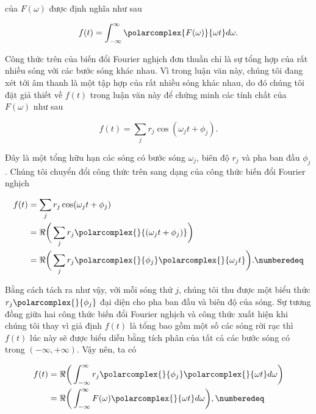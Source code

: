 		 của $F(\omega)$ được định nghĩa như sau
		
			\begin{equation}
				f(t) = \int_{-\infty}^{\infty} \polarcomplex{F(\omega)}{\omega t}d\omega.
			\end{equation}
			
		Công thức trên của biến đổi Fourier nghịch đơn thuần chỉ là sự tổng hợp của rất nhiều sóng với các bước sóng khác nhau. Vì trong luận văn này, chúng tôi đang xét tới âm thanh là một tập hợp của rất nhiều sóng khác nhau, do đó chúng tôi đặt giả thiết về $f(t)$ trong luận văn này để chứng minh các tính chất của $F(\omega)$ như sau
		
			\begin{equation}
				f(t) = \sum_{j} r_j\cos(\omega_j t + \phi_j).
			\end{equation}
			
		Đây là một tổng hữu hạn các sóng có bước sóng $\omega_j$, biên độ $r_j$ và pha ban đầu $\phi_j$. Chúng tôi chuyển đổi công thức trên sang dạng của công thức biến đổi Fourier nghịch
		
			\begin{align*}
				f(t) 	& =  \sum_{j} r_j\cos(\omega_j t + \phi_j) \\
						& =  \Re\bigg(\sum_{j} r_j\polarcomplex{}{(\omega_j t + \phi_j)}\bigg) \\
						& =  \Re\bigg(\sum_{j} r_j\polarcomplex{}{\phi_j}\polarcomplex{}{\omega_j t}\bigg). \numberedeq
				\label{ift::wave_formula}
			\end{align*}
		
		Bằng cách tách ra như vậy, với mỗi sóng thứ $j$, chúng tôi thu được một biểu thức $r_j\polarcomplex{}{\phi_j}$ đại diện cho pha ban đầu và biên độ của sóng. Sự tương đồng giữa hai công thức biến đổi Fourier nghịch và công thức  xuất hiện khi chúng tôi thay vì giả định $f(t)$ là tổng bao gồm một số các sóng rời rạc thì $f(t)$ lúc này sẽ được biểu diễn bằng tích phân của tất cả các bước sóng có trong $(-\infty, +\infty)$. Vậy nên, ta có
		
			\begin{align*}
				f(t) 	& =  \Re\bigg(\int_{-\infty}^{\infty} r_j\polarcomplex{}{\phi_j}\polarcomplex{}{\omega t}d\omega\bigg) \\
				& =  \Re\bigg(\int_{-\infty}^{\infty} F(\omega)\polarcomplex{}{\omega t}d\omega\bigg), \numberedeq
			\end{align*}
		
